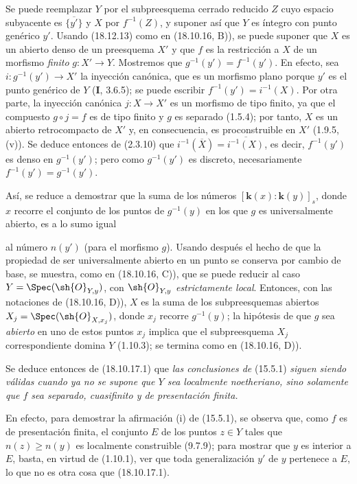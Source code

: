 Se puede reemplazar $Y$ por el subpreesquema cerrado reducido $Z$ cuyo espacio subyacente es $\overline{\{y'\}}$ y $X$ por $f^{-1}(Z)$, y suponer así que $Y$ es íntegro con punto genérico $y'$. Usando (18.12.13) como en (18.10.16, B)), se puede suponer que $X$ es un abierto denso de un preesquema $X'$ y que $f$ es la restricción a $X$ de un morfismo \emph{finito} $g:X'\to Y$. Mostremos que $g^{-1}(y')=f^{-1}(y')$. En efecto, sea $i:g^{-1}(y')\to X'$ la inyección canónica, que es un morfismo plano porque $y'$ es el punto genérico de $Y$ (\textbf I, 3.6.5); se puede escribir $f^{-1}(y')=i^{-1}(X)$. Por otra parte, la inyección canónica $j:X\to X'$ es un morfismo de tipo finito, ya que el compuesto $g\circ j=f$ es de tipo finito y $g$ es separado (1.5.4); por tanto, $X$ es un abierto retrocompacto de $X'$ y, en consecuencia, es proconstruible en $X'$ (1.9.5, (v)). Se deduce entonces de (2.3.10) que $i^{-1}(\overline{X})=\overline{i^{-1}(X)}$, es decir, $f^{-1}(y')$ es denso en $g^{-1}(y')$; pero como $g^{-1}(y')$ es discreto, necesariamente $f^{-1}(y')=g^{-1}(y')$.

Así, se reduce a demostrar que la suma de los números $[\boldsymbol{k}(x):\boldsymbol{k}(y)]_s$, donde $x$ recorre el conjunto de los puntos de $g^{-1}(y)$ en los que $g$ es universalmente abierto, es a lo sumo igual


al número $n(y')$ (para el morfismo $g$). Usando después el hecho de que la propiedad de ser universalmente abierto en un punto se conserva por cambio de base, se muestra, como en (18.10.16, C)), que se puede reducir al caso $Y=\Spec(\sh{O}_{Y,y})$, con $\sh{O}_{Y,y}$ \emph{estrictamente local}. Entonces, con las notaciones de (18.10.16, D)), $X$ es la suma de los subpreesquemas abiertos $X_j=\Spec(\sh{O}_{X,x_j})$, donde $x_j$ recorre $g^{-1}(y)$; la hipótesis de que $g$ sea \emph{abierto} en uno de estos puntos $x_j$ implica que el subpreesquema $X_j$ correspondiente domina $Y$ (1.10.3); se termina como en (18.10.16, D)).

Se deduce entonces de (18.10.17.1) que \emph{las conclusiones de} (15.5.1) \emph{siguen siendo válidas cuando ya no se supone que $Y$ sea localmente noetheriano, sino solamente que $f$ sea separado, cuasifinito y de presentación finita.}

En efecto, para demostrar la afirmación (i) de (15.5.1), se observa que, como $f$ es de presentación finita, el conjunto $E$ de los puntos $z\in Y$ tales que $n(z)\geq n(y)$ es localmente construible (9.7.9); para mostrar que $y$ es interior a $E$, basta, en virtud de (1.10.1), ver que toda generalización $y'$ de $y$ pertenece a $E$, lo que no es otra cosa que (18.10.17.1).

